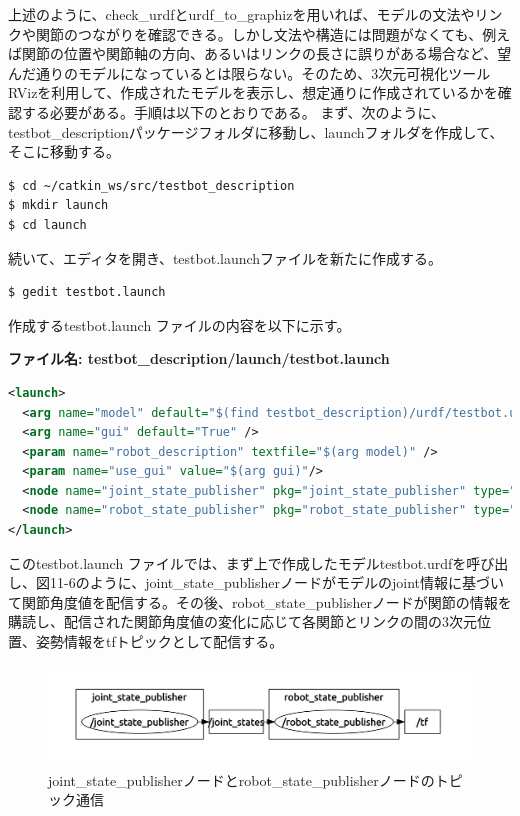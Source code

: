 上述のように、check\_urdfとurdf\_to\_graphizを用いれば、モデルの文法やリンクや関節のつながりを確認できる。しかし文法や構造には問題がなくても、例えば関節の位置や関節軸の方向、あるいはリンクの長さに誤りがある場合など、望んだ通りのモデルになっているとは限らない。そのため、3次元可視化ツールRVizを利用して、作成されたモデルを表示し、想定通りに作成されているかを確認する必要がある。手順は以下のとおりである。
まず、次のように、testbot\_descriptionパッケージフォルダに移動し、launchフォルダを作成して、そこに移動する。

\begin{lstlisting}[language=ROS]
$ cd ~/catkin_ws/src/testbot_description
$ mkdir launch
$ cd launch
\end{lstlisting}

続いて、エディタを開き、testbot.launchファイルを新たに作成する。

\begin{lstlisting}[language=ROS]
$ gedit testbot.launch
\end{lstlisting}

作成するtestbot.launch ファイルの内容を以下に示す。

\textbf{ファイル名: testbot\_description/launch/testbot.launch}

\begin{lstlisting}[language=XML]
<launch>
  <arg name="model" default="$(find testbot_description)/urdf/testbot.urdf" />
  <arg name="gui" default="True" />
  <param name="robot_description" textfile="$(arg model)" />
  <param name="use_gui" value="$(arg gui)"/>
  <node name="joint_state_publisher" pkg="joint_state_publisher" type="joint_state_publisher" />
  <node name="robot_state_publisher" pkg="robot_state_publisher" type="state_publisher" />
</launch>
\end{lstlisting}

このtestbot.launch ファイルでは、まず上で作成したモデルtestbot.urdfを呼び出し、図11-6のように、joint\_state\_publisherノードがモデルのjoint情報に基づいて関節角度値を配信する。その後、robot\_state\_publisherノードが関節の情報を購読し、配信された関節角度値の変化に応じて各関節とリンクの間の3次元位置、姿勢情報をtfトピックとして配信する。

\begin{figure}[htp]
  \centering
  \includegraphics[width=12cm]{pictures/chapter11/pic_11_06.png}
  \caption{joint\_state\_publisherノードとrobot\_state\_publisherノードのトピック通信}
\end{figure}

